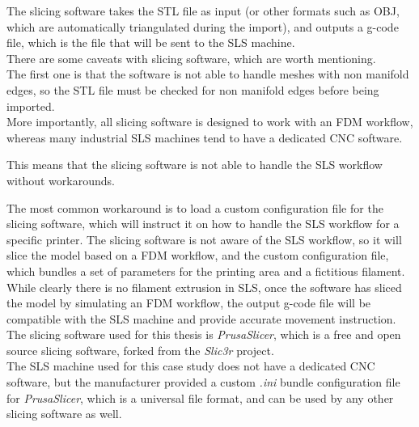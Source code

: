 \documentclass[a4paper]{article}
\begin{document}
          The slicing software takes the STL file as input (or other formats such as OBJ, which are
          automatically triangulated during the import), and outputs a g-code file, which is the file that will be sent to the SLS machine. \\
  
          There are some caveats with slicing software, which are worth mentioning. \\
  
          The first one is that the software is not able to handle meshes with non manifold edges, so 
          the STL file must be checked for non manifold edges before being imported. \\ 
  
          More importantly, all slicing software is designed to work with an FDM workflow, whereas 
          many industrial SLS machines tend to have a dedicated CNC software. 
  
          This means that the slicing software is not able to handle the SLS workflow without workarounds. 
  
          The most common workaround is to load a custom configuration file for the slicing software, 
          which will instruct it on how to handle the SLS workflow for a specific printer. 
          The slicing software is not aware of the SLS workflow, so it will slice the model 
          based on a FDM workflow, and the custom configuration file, which bundles a set of 
          parameters for the printing area and a fictitious filament. \\ 
  
          While clearly there is no filament extrusion in SLS, once the software has sliced the model by simulating 
          an FDM workflow, the output g-code file will be compatible with the SLS machine and provide 
          accurate movement instruction. \\
  
          The slicing software used for this thesis is \textit{PrusaSlicer}, 
          which is a free and open source slicing software, forked from the \textit{Slic3r} project. \\
  
          The SLS machine used for this case study does not have a dedicated CNC software, but the 
          manufacturer provided a custom \textit{.ini} bundle configuration file for \textit{PrusaSlicer}, which is
          a universal file format, and can be used by any other slicing software as well. \\
          
\end{document}
